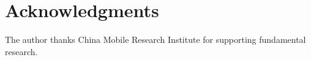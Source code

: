 \section*{Acknowledgments}

The author thanks China Mobile Research Institute for supporting fundamental research. 

